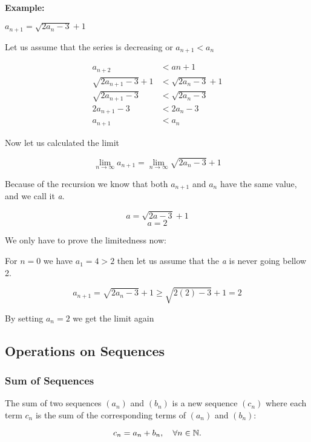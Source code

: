 \textbf{Example: } 
\vspace{\baselineskip}

\(a_{n + 1} = \sqrt{2a_n - 3} + 1\)
\vspace{\baselineskip}

Let us assume that the series is decreasing or \(a_{n + 1} < a_{n}\)

\begin{align*}
    a_{n + 2} &< a{n + 1} \\
    \sqrt{2a_{n + 1} -3} + 1 &< \sqrt{2a_{n} - 3} + 1 \\
    \sqrt{2a_{n + 1} -3} &< \sqrt{2a_{n} - 3} \\
    2a_{n + 1} - 3 &< 2a_{n} - 3 \\
    a_{n + 1} &< a_{n}
\end{align*}

\QED

Now let us calculated the limit

\[
    \lim_{n \rightarrow \infty} a_{n + 1} = \lim_{n \rightarrow \infty} \sqrt{2a_n - 3} + 1
\]

Because of the recursion we know that both \(a_{n + 1}\) and \(a_n\) have the same value, 
and we call it \emph{a}.

\[
    a = \sqrt{2a -3} +1
\]
\[
    a = 2
\]

We only have to prove the limitedness now:

For \(n = 0\) we have \(a_1 = 4 > 2\) then let us assume that the \emph{a} is never going bellow 2.

\[
    a_{n + 1} = \sqrt{2a_n - 3} + 1 \ge \sqrt{2(2) - 3} + 1 = 2
\]

By setting \(a_n = 2\) we get the limit again

\QED

\subsection{Operations on Sequences}

\subsubsection{Sum of Sequences}

The sum of two sequences \((a_n)\) and \((b_n)\) is a new sequence \((c_n)\) where each term 
\(c_n\) is the sum of the corresponding terms of \((a_n)\) and \((b_n)\):

\[
    c_n = a_n + b_n, \quad \forall n \in \mathbb{N}.
\]

